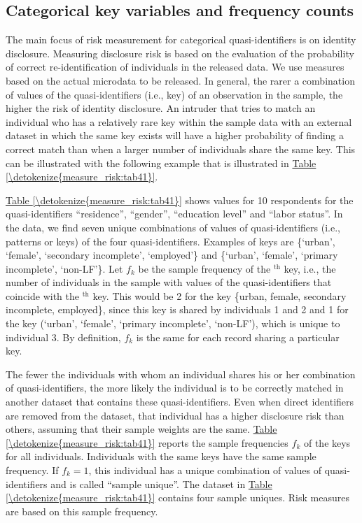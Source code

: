 \documentclass[letterpaper,10pt,english]{sphinxmanual}
\begin{document}
\subsection{Categorical key variables and frequency counts}
\label{\detokenize{measure_risk:categorical-key-variables-and-frequency-counts}}
The main focus of risk measurement for categorical quasi-identifiers is
on identity disclosure. Measuring disclosure risk is based on the
evaluation of the probability of correct re-identification of
individuals in the released data. We use measures based on the actual
microdata to be released. In general, the rarer a combination of values
of the quasi-identifiers (i.e., key) of an observation in the sample,
the higher the risk of identity disclosure. An intruder that tries to
match an individual who has a relatively rare key within the sample data
with an external dataset in which the same key exists will have a higher
probability of finding a correct match than when a larger number of
individuals share the same key. This can be illustrated with the
following example that is illustrated in \hyperref[\detokenize{measure_risk:tab41}]{Table \ref{\detokenize{measure_risk:tab41}}}.

\hyperref[\detokenize{measure_risk:tab41}]{Table \ref{\detokenize{measure_risk:tab41}}} shows values for 10 respondents for the quasi-identifiers
“residence”, “gender”, “education level” and “labor status”. In the
data, we find seven unique combinations of values of quasi-identifiers
(i.e., patterns or keys) of the four quasi-identifiers. Examples of keys
are \{‘urban’, ‘female’, ‘secondary incomplete’, ‘employed’\} and
\{‘urban’, ‘female’, ‘primary incomplete’, ‘non-LF’\}. Let \(f_{k}\)
be the sample frequency of the $^{\text{th}}$ key, i.e., the number of
individuals in the sample with values of the quasi-identifiers that
coincide with the $^{\text{th}}$ key. This would be 2 for the key
\{urban, female, secondary incomplete, employed\}, since this key is
shared by individuals 1 and 2 and 1 for the key (‘urban’, ‘female’,
‘primary incomplete’, ‘non-LF’), which is unique to individual 3. By
definition, \(f_{k}\) is the same for each record sharing a
particular key.

The fewer the individuals with whom an individual shares his or her
combination of quasi-identifiers, the more likely the individual is to
be correctly matched in another dataset that contains these
quasi-identifiers. Even when direct identifiers are removed from the
dataset, that individual has a higher disclosure risk than others,
assuming that their sample weights are the same. \hyperref[\detokenize{measure_risk:tab41}]{Table \ref{\detokenize{measure_risk:tab41}}} reports the
sample frequencies \(f_{k}\) of the keys for all individuals.
Individuals with the same keys have the same sample frequency. If
\(f_{k} = 1\), this individual has a unique combination of values of
quasi-identifiers and is called “sample unique”. The dataset in \hyperref[\detokenize{measure_risk:tab41}]{Table \ref{\detokenize{measure_risk:tab41}}}
contains four sample uniques. Risk measures are based on this sample
frequency.
\end{document}
